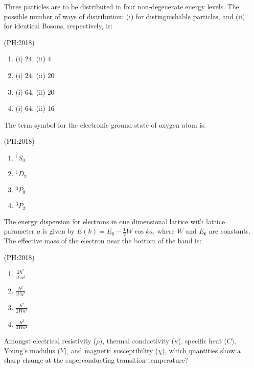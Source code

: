     \item Three particles are to be distributed in four non-degenerate energy levels. The possible number of ways of distribution: (i) for distinguishable particles, and (ii) for identical Bosons, respectively, is:

    \hfill{(PH:2018)}
    \begin{multicols}{4}
    \begin{enumerate}
        \item (i) $24$, (ii) $4$
        \item (i) $24$, (ii) $20$
        \item (i) $64$, (ii) $20$
        \item (i) $64$, (ii) $16$
    \end{enumerate}
	    \end{multicols}
  

    \item The term symbol for the electronic ground state of oxygen atom is:

    \hfill{(PH:2018)}
    \begin{multicols}{4}
    \begin{enumerate}
        \item $^1S_0$
        \item $^1D_{2}$
        \item $^3P_0$
        \item $^3P_{2}$
    \end{enumerate}
	    \end{multicols}
    

    \item The energy dispersion for electrons in one dimensional lattice with lattice parameter $a$ is given by $E(k) = E_0 - \frac{1}{2}W \cos ka$, where $W$ and $E_0$ are constants. The effective mass of the electron near the bottom of the band is:

    \hfill{(PH:2018)}
    \begin{multicols}{4}
    \begin{enumerate}
        \item $\frac{2\hbar^2}{W a^2}$
        \item $\frac{\hbar^2}{W a^2}$
        \item $\frac{\hbar^2}{2W a^2}$
        \item $\frac{\hbar^2}{4W a^2}$
    \end{enumerate}
	    \end{multicols}


    \item Amongst electrical resistivity ($\rho$), thermal conductivity ($\kappa$), specific heat ($C$), Young's modulus ($Y$), and magnetic susceptibility ($\chi$), which quantities show a sharp change at the superconducting transition temperature?

